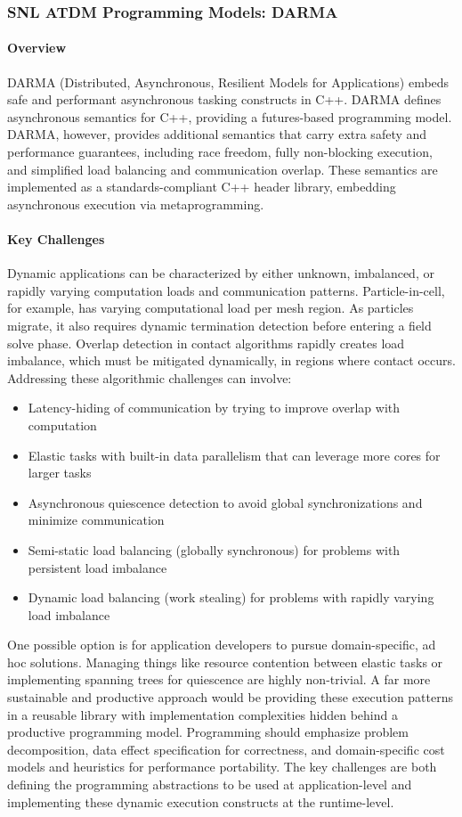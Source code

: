 \subsubsection{ SNL ATDM Programming Models: DARMA} 

\paragraph{Overview} 
DARMA (Distributed, Asynchronous, Resilient Models for Applications) embeds safe and performant asynchronous tasking constructs in C++.
DARMA defines asynchronous semantics for C++, providing a futures-based programming model. 
DARMA, however, provides additional semantics that carry extra safety and performance guarantees,
including race freedom, fully non-blocking execution, and simplified load balancing and communication overlap.
These semantics are implemented as a standards-compliant C++ header library,
embedding asynchronous execution via metaprogramming.

\paragraph{Key Challenges}
Dynamic applications can be characterized by either unknown, imbalanced, or rapidly varying computation loads and communication patterns.
Particle-in-cell, for example, has varying computational load per mesh region. As particles migrate, it also requires dynamic termination detection before entering a field solve phase. 
Overlap detection in contact algorithms rapidly creates load imbalance, which must be mitigated dynamically, in regions where contact occurs. Addressing these algorithmic challenges can involve:
\begin{itemize}
\item Latency-hiding of communication by trying to improve overlap with computation
\item Elastic tasks with built-in data parallelism that can leverage more cores for larger tasks
\item Asynchronous quiescence detection to avoid global synchronizations and minimize communication
\item Semi-static load balancing (globally synchronous) for problems with persistent load imbalance
\item Dynamic load balancing (work stealing) for problems with rapidly varying load imbalance
\end{itemize}
One possible option is for application developers to pursue domain-specific, ad hoc solutions.
Managing things like resource contention between elastic tasks or implementing spanning trees for quiescence are highly non-trivial.
A far more sustainable and productive approach would be providing these execution patterns in a reusable library with implementation complexities hidden behind a productive programming model.
Programming should emphasize problem decomposition, data effect specification for correctness, and domain-specific cost models and heuristics for performance portability.
The key challenges are both defining the programming abstractions to be used at application-level and implementing these dynamic execution constructs at the runtime-level.

